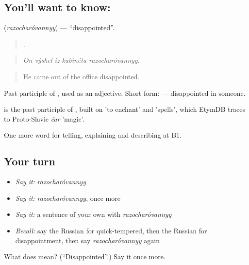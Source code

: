 \subsection*{You'll want to know: }
\textbf{} (\emph{razocharóvannyy}) — \textquotedblleft{}disappointed\textquotedblright{}.

\begin{quote}
    .
\end{quote}

\begin{quote}
\emph{On výshel iz kabinéta razocharóvannyy.}
\end{quote}

\begin{quote}
He came out of the office disappointed.
\end{quote}

Past participle of \emph{}, used as an adjective. Short form: \emph{  } — disappointed in someone.

\begin{cousinweb}
\emph{} is the past participle of \emph{}, built on \emph{} 'to enchant' and \emph{} 'spells', which EtymDB traces to Proto-Slavic \emph{čar} 'magic'.
\end{cousinweb}

\begin{grammarlens}[title={What you've built}]
One more word for telling, explaining and describing at B1.
\end{grammarlens}

\subsection*{Your turn}
\begin{itemize}
\raggedright
  \item \emph{Say it:} \emph{razocharóvannyy}
  \item \emph{Say it:} \emph{razocharóvannyy}, once more
  \item \emph{Say it:} a sentence of your own with \emph{razocharóvannyy}
  \item \emph{Recall:} say the Russian for quick-tempered, then the Russian for disappointment, then say \emph{razocharóvannyy} again
\end{itemize}

\begin{tcolorbox}[breakable,colback=teal!4,colframe=teal!35!black,title={Before you move on}]
What does  mean? (\textquotedblleft{}Disappointed\textquotedblright{}.) Say it once more.
\end{tcolorbox}
